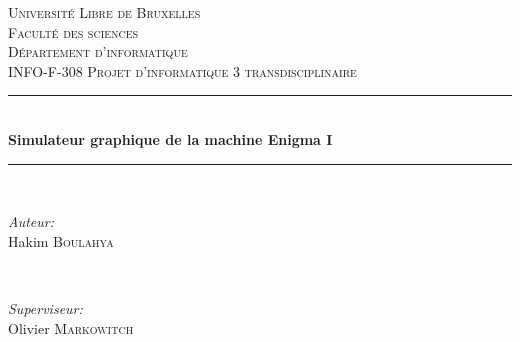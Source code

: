 \begin{titlepage}


\newcommand{\imagepath}{../image}
\newcommand{\university}{Université Libre de Bruxelles}
\newcommand{\faculty}{Faculté des sciences \\ Département d'informatique}
\newcommand{\course}{INFO-F-308 Projet d'informatique 3 transdisciplinaire}
\newcommand{\authors}{Hakim \textsc{Boulahya}}
\newcommand{\supervisor}{Olivier \textsc{Markowitch}}
\newcommand{\HRule}{\rule{\linewidth}{0.5mm}} %

\center %
 

\textsc{\LARGE \university}\\[1.5cm] %
\textsc{\Large \faculty}\\[0.5cm] %
\textsc{\large \course}\\[0.5cm] %


\HRule \\[0.4cm]
{ \huge \bfseries Simulateur graphique de la machine Enigma I}\\[0.4cm] %
\HRule \\[1.5cm]
 

\begin{minipage}{0.4\textwidth}
\begin{flushleft} \large
\emph{Auteur:}\\
\authors
\end{flushleft}
\end{minipage}
~
\begin{minipage}{0.4\textwidth}
\begin{flushright} \large
\emph{Superviseur:} \\
\supervisor %
\end{flushright}
\end{minipage}\\[2cm]


\end{titlepage}

